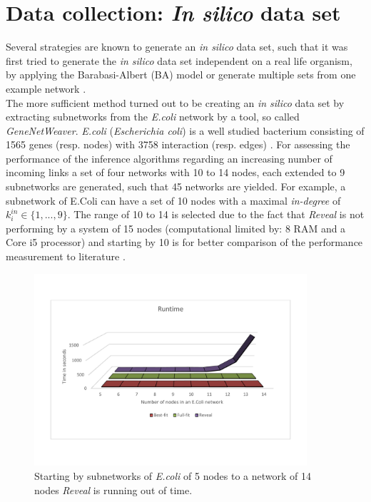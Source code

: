 \newpage
\section{Data collection: \textit{In silico} data set}

Several strategies are known to generate an \textit{in silico} data set, such that it was first tried to generate the \textit{in silico} data set independent on a real life organism, by applying the Barabasi-Albert (BA) model or generate multiple sets from one example network \citep{Barab&aacute.1999}.\\
The more sufficient method turned out to be creating an \textit{in silico} data set by extracting subnetworks from the \textit{E.coli} network by a tool, so called \textit{GeneNetWeaver}. \textit{E.coli} (\textit{Escherichia coli}) is a well studied bacterium consisting of 1565 genes (resp. nodes) with 3758 interaction (resp. edges) \cite{Schaffter.2011}. For assessing the performance of the inference algorithms regarding an increasing number of incoming links a set of four networks with 10 to 14 nodes, each extended to 9 subnetworks are generated, such that 45 networks are yielded. For example, a subnetwork of E.Coli can have a set of 10 nodes with a maximal \textit{in-degree} of $k^{in}_{i}\in\{1,...,9\}$. The range of 10 to 14 is selected due to the fact that \textit{Reveal} is not performing by a system of 15 nodes (computational limited by: 8 RAM and a Core i5 processor) and starting by 10 is for better comparison of the performance measurement to literature  \citep{Barman.2017}.

\begin{figure}[H]
\captionsetup{width=0.8\linewidth}
\centering
\includegraphics[width=0.9\textwidth]{./Bilder/Scoring/insilico/1_Indegree_Runtime/Runtime_nodes.pdf}
\caption[Runtime of Boolean Network Inference algorithms]{Starting by subnetworks of \textit{E.coli} of 5 nodes to a network of 14 nodes \textit{Reveal} is running out of time.}
\label{fig:}
\end{figure}

